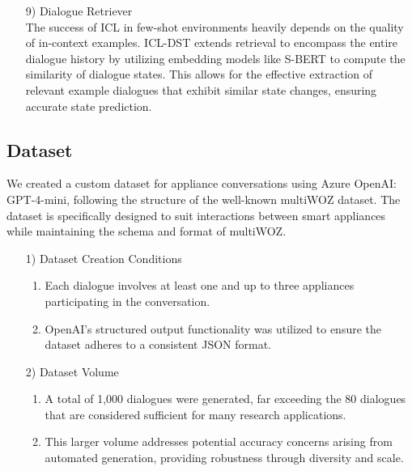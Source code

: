 \documentclass[conference]{IEEEtran}
\begin{document}
\begin{enumerate}
\begin{itemize}
\begin{itemize}
\begin{enumerate}
\begin{itemize}
    \item [9)] Dialogue Retriever \\
The success of ICL in few-shot environments heavily depends on the quality of in-context examples. ICL-DST extends retrieval to encompass the entire dialogue history by utilizing embedding models like S-BERT to compute the similarity of dialogue states. This allows for the effective extraction of relevant example dialogues that exhibit similar state changes, ensuring accurate state prediction. \\
\end{itemize}

\subsection{Dataset}

We created a custom dataset for appliance conversations using Azure OpenAI: GPT-4-mini, following the structure of the well-known multiWOZ dataset. The dataset is specifically designed to suit interactions between smart appliances while maintaining the schema and format of multiWOZ. \\

\begin{itemize} 
    \item [1)] Dataset Creation Conditions
    \begin{enumerate}
        \item Each dialogue involves at least one and up to three appliances participating in the conversation.
        \item OpenAI's structured output functionality was utilized to ensure the dataset adheres to a consistent JSON format. \\
    \end{enumerate}
\end{itemize}


\begin{itemize}
    \item [2)] Dataset Volume
    \begin{enumerate}
    \item A total of 1,000 dialogues were generated, far exceeding the 80 dialogues that are considered sufficient for many research applications.
    \item This larger volume addresses potential accuracy concerns arising from automated generation, providing robustness through diversity and scale. \\
    \end{enumerate}
\end{itemize}



\end{enumerate}
\end{itemize}
\end{itemize}
\end{enumerate}
\end{document}
